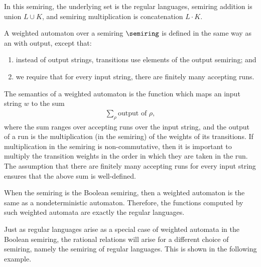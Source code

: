 \begin{myexample}
    In this semiring, the underlying set is the regular languages, semiring addition is union $L \cup K$, and semiring multiplication is concatenation $L \cdot K$.
\end{myexample}



\begin{definition}\label{def:weighted-automaton}
    A weighted automaton over a semiring $\semiring$ is defined in the same way as an \nfa with output, except that:
    \begin{enumerate}
        \item instead of output strings, transitions use elements of the output semiring; and 
        \item we require that for every input string, there are finitely many accepting runs.
    \end{enumerate}
\end{definition}

The semantics of a weighted automaton is the function which maps an input string $w$ to the sum 
\begin{align*}
\sum_\rho \text{output of $\rho$},
\end{align*}
where the sum ranges over accepting runs over the input string, and the output of a run is the multiplication (in the semiring) of the weights of its transitions. If multiplication in the semiring is non-commutative, then it is important to multiply the transition weights in the order in which they are taken in the run. The assumption that there are finitely many accepting runs for every input string ensures that the above sum is well-defined.


\begin{myexample}
    When the semiring is the Boolean semiring, then a weighted automaton is the same as a nondeterministic automaton. Therefore, the functions computed by such weighted automata are exactly the regular languages.
\end{myexample}

Just as regular languages arise as a special case of weighted automata in the Boolean semiring, the rational relations will arise for a different choice of semiring, namely the semiring of regular languages. This is shown in the following example.

